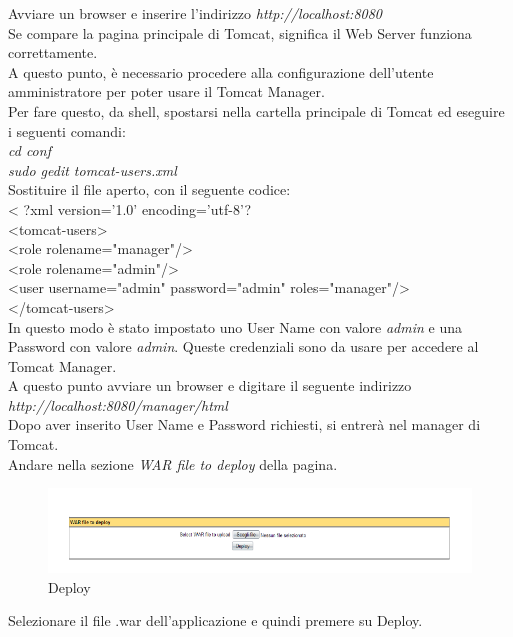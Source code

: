 Avviare un browser e inserire l'indirizzo \textit{http://localhost:8080}\\
Se compare la pagina principale di Tomcat, significa il Web Server funziona correttamente.\\
A questo punto, \`e necessario procedere alla configurazione dell'utente amministratore per poter usare il Tomcat Manager.\\
Per fare questo, da shell, spostarsi nella cartella principale di Tomcat ed eseguire i seguenti comandi:\\
\textit{cd conf}\\
\textit{sudo gedit tomcat-users.xml}\\
Sostituire il file aperto, con il seguente codice:\\
< ?xml version='1.0' encoding='utf-8'?\> \\
<tomcat-users>\\
  <role rolename="manager"/>\\
  <role rolename="admin"/>\\
  <user username="admin" password="admin" roles="manager"/>\\
</tomcat-users> \\

In questo modo \`e stato impostato uno User Name con valore \textit{admin} e una Password con valore \textit{admin}. Queste credenziali sono da usare per accedere al Tomcat Manager.\\
A questo punto avviare un browser e digitare il seguente indirizzo\\ \textit{http://localhost:8080/manager/html}\\
Dopo aver inserito User Name e Password richiesti, si entrer\`a nel manager di Tomcat.\\
Andare nella sezione \textit{WAR file to deploy} della pagina.

\newpage
\begin{figure}[!ht]
\centering
\includegraphics[scale=0.7]{images/DeployTomcat.png}
\caption{Deploy}
\end{figure} 

Selezionare il file .war dell'applicazione e quindi premere su Deploy.\\

